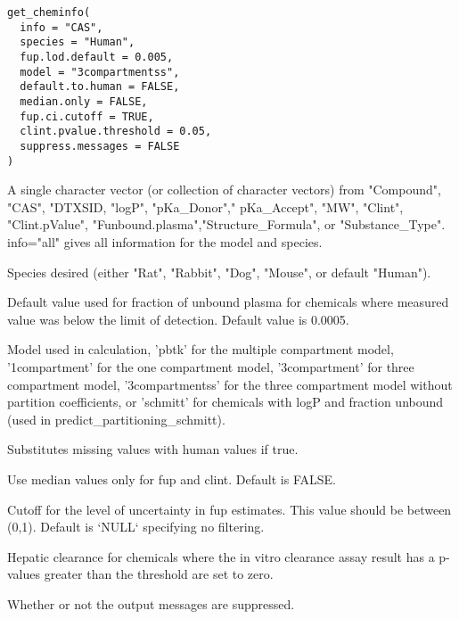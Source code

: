\documentclass[a4paper]{book}
\begin{document}
%
\begin{Usage}
\begin{verbatim}
get_cheminfo(
  info = "CAS",
  species = "Human",
  fup.lod.default = 0.005,
  model = "3compartmentss",
  default.to.human = FALSE,
  median.only = FALSE,
  fup.ci.cutoff = TRUE,
  clint.pvalue.threshold = 0.05,
  suppress.messages = FALSE
)
\end{verbatim}
\end{Usage}
%
\begin{Arguments}
\begin{ldescription}
\item[\code{info}] A single character vector (or collection of character vectors)
from "Compound", "CAS", "DTXSID, "logP", "pKa\_Donor"," pKa\_Accept", "MW", "Clint",
"Clint.pValue", "Funbound.plasma","Structure\_Formula", or "Substance\_Type". info="all"
gives all information for the model and species.

\item[\code{species}] Species desired (either "Rat", "Rabbit", "Dog", "Mouse", or
default "Human").

\item[\code{fup.lod.default}] Default value used for fraction of unbound plasma for
chemicals where measured value was below the limit of detection. Default
value is 0.0005.

\item[\code{model}] Model used in calculation, 'pbtk' for the multiple compartment
model, '1compartment' for the one compartment model, '3compartment' for
three compartment model, '3compartmentss' for the three compartment model
without partition coefficients, or 'schmitt' for chemicals with logP and
fraction unbound (used in predict\_partitioning\_schmitt).

\item[\code{default.to.human}] Substitutes missing values with human values if
true.

\item[\code{median.only}] Use median values only for fup and clint.  Default is FALSE.

\item[\code{fup.ci.cutoff}] Cutoff for the level of uncertainty in fup estimates.
This value should be between (0,1). Default is `NULL` specifying no filtering.

\item[\code{clint.pvalue.threshold}] Hepatic clearance for chemicals where the in
vitro clearance assay result has a p-values greater than the threshold are
set to zero.

\item[\code{suppress.messages}] Whether or not the output messages are suppressed.
\end{ldescription}
\end{Arguments}
\end{document}
